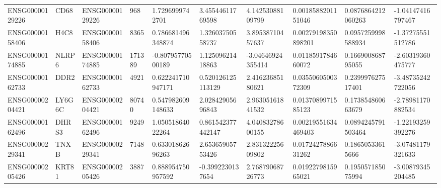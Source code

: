 \begin{tabular}{@{}llllllllll@{}}
ENSG00000129226 & CD68 & ENSG00000129226 & 968 & 1.7296999742701 & 3.45544611769598 & 4.14253088109799 & 0.0018588201151046 & 0.0876864212060263 & -1.04147416797467 \\
ENSG00000158406 & H4C8 & ENSG00000158406 & 8365 & 0.786681496348874 & 1.32603750558737 & 3.89538710457637 & 0.00279198350898201 & 0.0957259998588934 & -1.37275551512786 \\
ENSG00000174885 & NLRP6 & ENSG00000174885 & 171389 & -0.80795770500189 & 1.12509621418863 & -3.04646924355414 & 0.0118591784660072 & 0.166900868795055 & -2.60319360475777 \\
ENSG00000162733 & DDR2 & ENSG00000162733 & 4921 & 0.622241710947171 & 0.520126125113129 & 2.41623685180621 & 0.0355060500372309 & 0.239997627517401 & -3.48735242722056 \\
ENSG00000204421 & LY6G6C & ENSG00000204421 & 80740 & 0.547982609148633 & 2.02842905696843 & 2.96305161841532 & 0.0137089971585123 & 0.173854860663679 & -2.78981170882534 \\
ENSG00000162496 & DHRS3 & ENSG00000162496 & 9249 & 1.05051864022264 & 0.861542377442147 & 4.04083278600155 & 0.00219551634469403 & 0.0894245791503464 & -1.22193259392276 \\
ENSG00000229341 & TNXB & ENSG00000229341 & 7148 & 0.63301862696263 & 2.65365905753426 & 2.83132225609802 & 0.0172427886631262 & 0.18650533615666 & -3.07481179321633 \\
ENSG00000205426 & KRT81 & ENSG00000205426 & 3887 & 0.888954750957592 & -0.3992230137654 & 2.76879068726773 & 0.0192279815965021 & 0.195057185075994 & -3.00879345204485 \\
\bottomrule
\end{tabular}
\endgroup
